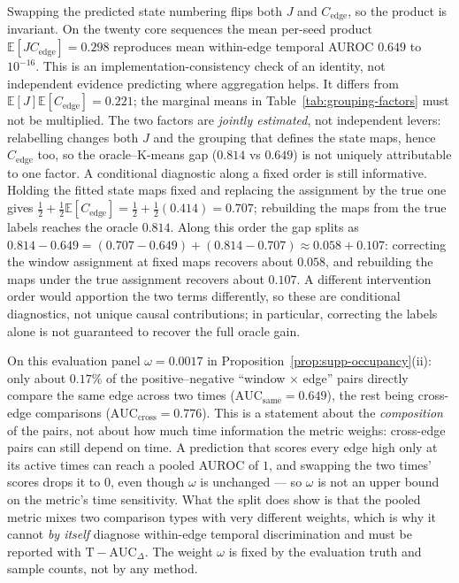 \documentclass[11pt]{article}
\begin{document}
Swapping the predicted state numbering flips both $J$ and $C_{\mathrm{edge}}$, so
the product is invariant. On the twenty core sequences the mean per-seed product
$\mathbb E[JC_{\mathrm{edge}}]=0.298$ reproduces mean within-edge temporal AUROC $0.649$
to $10^{-16}$. This is an implementation-consistency check of an
identity, not independent evidence predicting where aggregation helps.
It differs from $\mathbb E[J]\mathbb E[C_{\mathrm{edge}}]=0.221$;
the marginal means in Table~\ref{tab:grouping-factors} must not be multiplied.
The two factors are \emph{jointly estimated}, not independent
levers: relabelling changes both $J$ and the grouping that defines the state
maps, hence $C_{\mathrm{edge}}$ too, so the oracle--K-means gap ($0.814$ vs
$0.649$) is not uniquely attributable to one factor. A conditional diagnostic
along a fixed order is still informative. Holding the fitted state maps fixed and
replacing the assignment by the true one gives $\tfrac12+\tfrac12\mathbb
E[C_{\mathrm{edge}}]=\tfrac12+\tfrac12(0.414)=0.707$; rebuilding the maps from
the true labels reaches the oracle $0.814$. Along this order the gap splits as
$0.814-0.649=(0.707-0.649)+(0.814-0.707)\approx0.058+0.107$: correcting the
window assignment at fixed maps recovers about $0.058$, and rebuilding the maps
under the true assignment recovers about $0.107$. A different intervention order
would apportion the two terms differently, so these are conditional diagnostics,
not unique causal contributions; in particular, correcting the labels alone is
not guaranteed to recover the full oracle gain.

On this evaluation panel $\omega=0.0017$ in Proposition~\ref{prop:supp-occupancy}(ii): only about
$0.17\%$ of the positive--negative ``window $\times$ edge'' pairs directly compare
the same edge across two times ($\mathrm{AUC}_{\mathrm{same}}=0.649$), the rest
being cross-edge comparisons ($\mathrm{AUC}_{\mathrm{cross}}=0.776$). This is a
statement about the \emph{composition} of the pairs, not about how much time
information the metric weighs: cross-edge pairs can still depend on time. A
prediction that scores every edge high only at its active times can reach a
pooled AUROC of $1$, and swapping the two times' scores drops it to $0$, even
though $\omega$ is unchanged --- so $\omega$ is not an upper bound on the
metric's time sensitivity. What the split does show is that the pooled metric
mixes two comparison types with very different weights, which is why it cannot
\emph{by itself} diagnose within-edge temporal discrimination and must be reported with
$\mathrm{T\!-\!AUC}_{\Delta}$. The weight $\omega$ is fixed by the evaluation
truth and sample counts, not by any method.
\end{document}
